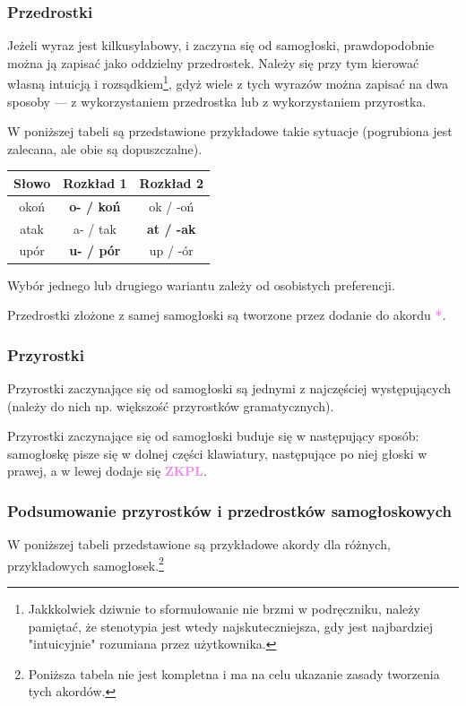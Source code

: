 \documentclass[12p, oneside]{book}
\newcommand{\steno}[1]{\textbf{\textsf{\textcolor{violet}{ #1}}}}
\begin{document}
\subsubsection{Przedrostki}

Jeżeli wyraz jest kilkusylabowy, i zaczyna się od samogłoski, prawdopodobnie można ją zapisać jako oddzielny przedrostek. Należy się przy tym kierować własną intuicją i rozsądkiem\footnote{Jakkkolwiek dziwnie to sformułowanie nie brzmi w podręczniku, należy pamiętać, że stenotypia jest wtedy najskuteczniejsza, gdy jest najbardziej "intuicyjnie" rozumiana przez użytkownika.}, gdyż wiele z tych wyrazów można zapisać na dwa sposoby --- z wykorzystaniem przedrostka lub z wykorzystaniem przyrostka.

W poniższej tabeli są przedstawione przykładowe takie sytuacje (pogrubiona jest zalecana, ale obie są dopuszczalne).

\begin{tabular}{|c|c|c|}
	\hline
	Słowo & Rozkład 1 & Rozkład 2 \\ \hline
	okoń & \textbf{o- / koń} & ok / -oń \\ \hline
	atak & a- / tak & \textbf{at / -ak} \\ \hline
	upór & \textbf{u- / pór} & up / -ór \\ \hline
\end{tabular}

Wybór jednego lub drugiego wariantu zależy od osobistych preferencji.

Przedrostki złożone z samej samogłoski są tworzone przez dodanie do akordu \steno{*}.

\subsubsection{Przyrostki}

Przyrostki zaczynające się od samogłoski są jednymi z najczęściej występujących (należy do nich np. większość przyrostków gramatycznych).

Przyrostki zaczynające się od samogłoski buduje się w następujący sposób: samogłoskę pisze się w dolnej części klawiatury, następujące po niej głoski w prawej, a w lewej dodaje się \steno{ZKPL}.

\subsubsection{Podsumowanie przyrostków i przedrostków samogłoskowych}

W poniższej tabeli przedstawione są przykładowe akordy dla różnych, przykładowych samogłosek.\footnote{Poniższa tabela nie jest kompletna i ma na celu ukazanie zasady tworzenia tych akordów.}
\end{document}
